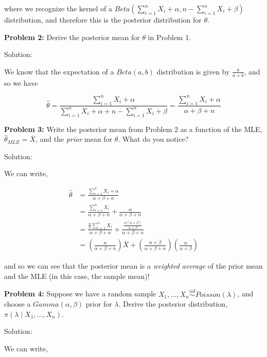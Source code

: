 \documentclass[
  letterpaper,
  DIV=11,
  numbers=noendperiod]{scrreprt}
\begin{document}
where we recognize the kernel of a
\(Beta(\sum_{i = 1}^n X_i + \alpha, n - \sum_{i = 1}^n X_i + \beta)\)
distribution, and therefore this is the posterior distribution for
\(\theta\).

\textbf{Problem 2:} Derive the posterior mean for \(\theta\) in Problem
1.

Solution:

We know that the expectation of a \(Beta(a, b)\) distribution is given
by \(\frac{a}{a + b}\), and so we have

\[
\hat{\theta} = \frac{\sum_{i = 1}^n X_i + \alpha}{\sum_{i = 1}^n X_i + \alpha + n - \sum_{i = 1}^n X_i + \beta} = \frac{\sum_{i = 1}^n X_i + \alpha}{\alpha + \beta + n}
\]

\textbf{Problem 3:} Write the posterior mean from Problem 2 as a
function of the MLE, \(\hat{\theta}_{MLE} = \overline{X}\), and the
\emph{prior} mean for \(\theta\). What do you notice?

Solution:

We can write,

\begin{align*}
    \hat{\theta} & = \frac{\sum_{i = 1}^n X_i + \alpha}{\alpha + \beta + n} \\
    & = \frac{\sum_{i = 1}^n X_i }{\alpha + \beta + n} + \frac{\alpha}{\alpha + \beta + n} \\
    & = \frac{\frac{n}{n} \sum_{i = 1}^n X_i}{\alpha + \beta + n} + \frac{\frac{\alpha (\alpha + \beta)}{\alpha + \beta}}{\alpha + \beta + n} \\
    & = \left( \frac{n}{\alpha + \beta + n} \right) \overline{X} + \left( \frac{\alpha + \beta}{\alpha + \beta + n}\right) \left( \frac{\alpha}{\alpha + \beta}\right)
\end{align*}

and so we can see that the posterior mean is a \emph{weighted average}
of the prior mean and the MLE (in this case, the sample mean)!

\textbf{Problem 4:} Suppose we have a random sample
\(X_1, \dots, X_n \overset{iid}{\sim} Poisson(\lambda)\), and choose a
\(Gamma(\alpha, \beta)\) prior for \(\lambda\). Derive the posterior
distribution, \(\pi(\lambda \mid X_1, \dots, X_n)\).

Solution:

We can write,
\end{document}
